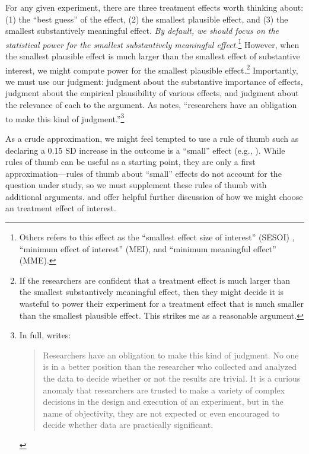 \documentclass[12pt]{article}
\begin{document}
For any given experiment, there are three treatment effects worth thinking about: (1) the ``best guess'' of the effect, (2) the smallest plausible effect, and (3) the smallest substantively meaningful effect. 
\emph{By default, we should focus on the statistical power for the smallest substantively meaningful effect.}\footnote{
  Others refers to this effect as the ``smallest effect size of interest'' (SESOI) \citep{Lakens2018}, ``minimum effect of interest'' (MEI), and ``minimum meaningful effect'' (MME).
  }
However, when the smallest plausible effect is much larger than the smallest effect of substantive interest, we might compute power for the smallest plausible effect.\footnote{
  If the researchers are confident that a treatment effect is much larger than the smallest substantively meaningful effect, then they might decide it is wasteful to power their experiment for a treatment effect that is much smaller than the smallest plausible effect. 
  This strikes me as a reasonable argument.
  } 
Importantly, we must use our judgment: judgment about the substantive importance of effects, judgment about the empirical plausibility of various effects, and judgment about the relevance of each to the argument. 
As \citet[755]{Kirk1996} notes, ``researchers have an obligation to make this kind of judgment.''\footnote{
In full, \citet[755]{Kirk1996} writes:
\begin{quote}
  Researchers have an obligation to make this kind of judgment. 
  No one is in a better position than the researcher who collected and analyzed the data to decide whether or not the results are trivial. 
  It is a curious anomaly that researchers are trusted to make a variety of complex decisions in the design and execution of an experiment, but in the name of objectivity, they are not expected or even encouraged to decide whether data are practically significant.  
\end{quote}
} 

As a crude approximation, we might feel tempted to use a rule of thumb such as declaring a 0.15 SD increase in the outcome is a ``small'' effect (e.g., \citealt{Lovakov2021}). 
While rules of thumb can be useful as a starting point, they are only a first approximation---rules of thumb about ``small'' effects do not account for the question under study, so we must supplement these rules of thumb with additional arguments. 
\citet[see esp. pp. 261-263]{Lakens2018} and \citet[see esp. pp. 10-13]{Lakens2022} offer helpful further discussion of how we might choose an treatment effect of interest.
\end{document}
